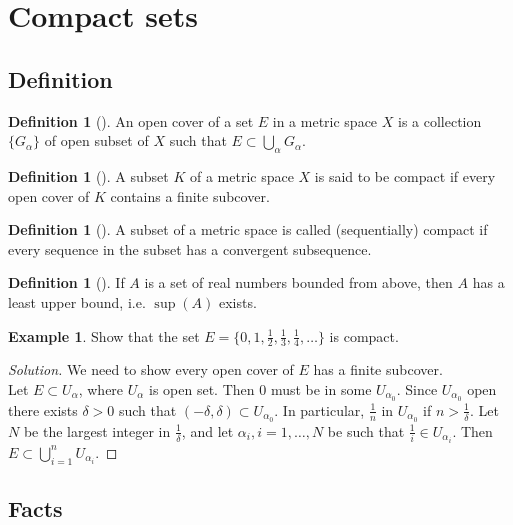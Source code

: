 \documentclass[	DIV=calc,paper=a4,fontsize=11pt]{scrartcl}	 	%
\theoremstyle{definition}
\newtheorem{defn}[thm]{Definition}
\newtheorem{exmp}[thm]{Example}
\theoremstyle{plain}
\theoremstyle{remark}
\begin{document}
\newpage
\section{Compact sets}

\subsection{Definition}

\begin{defn}[\textbf{\color{blue}{Cover}}]
An open cover of a set $E$ in a metric space $X$ is a collection $\{G_{\alpha}\}$ of open subset of $X$ such that $E\subset \bigcup_{\alpha}G_{\alpha}$.
\end{defn}

\begin{defn}[\textbf{\color{blue}{Compact}}]
A subset $K$ of a metric space $X$ is said to be compact if every open cover of $K$ contains a finite subcover.
\end{defn}

\begin{defn}[\textbf{\color{blue}{Sequentially Compact}}]
A subset of a metric space is called (sequentially) compact if every sequence in the subset has a convergent subsequence.
\end{defn}

\begin{defn}[\textbf{\color{blue}{Least Upper Bound Axiom}}]
If $A$ is a set of real numbers bounded from above, then $A$ has a least upper bound, i.e. $\sup (A)$ exists.
\end{defn}

\begin{exmp}
Show that the set $E=\{0,1,\frac{1}{2},\frac{1}{3},\frac{1}{4},\ldots\}$ is compact.
\end{exmp}
\begin{proof}[Solution]
We need to show every open cover of $E$ has a finite subcover.\\
Let $E\subset U_{\alpha}$, where $U_{\alpha}$ is open set. Then $0$ must be in some $U_{\alpha_0}$. Since $U_{\alpha_0}$ open there exists $\delta>0$ such that $(-\delta,\delta)\subset U_{\alpha_0}$. In particular, $\frac{1}{n}$ in $U_{\alpha_0}$ if $n>\frac{1}{\delta}$. Let $N$ be the largest integer in $\frac{1}{\delta}$, and let $\alpha_i, i=1,\ldots,N$ be such that $\frac{1}{i}\in U_{\alpha_i}$. Then  $E\subset \bigcup_{i=1}^{n} U_{\alpha_i}$.
\end{proof}
\subsection{Facts}
\end{document}
